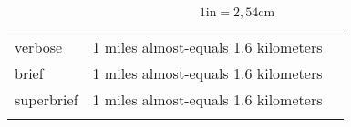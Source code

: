 \E \[1\text{in}=2,54\text{cm}\]
\begin{longtable}[c]{@{}lll@{}}
\toprule\addlinespace
verbose & 1 miles almost-equals 1.6 kilometers &

\\\addlinespace
brief & 1 miles almost-equals 1.6 kilometers &

\\\addlinespace
superbrief & 1 miles almost-equals 1.6 kilometers &

\\\addlinespace
\bottomrule
\end{longtable}



